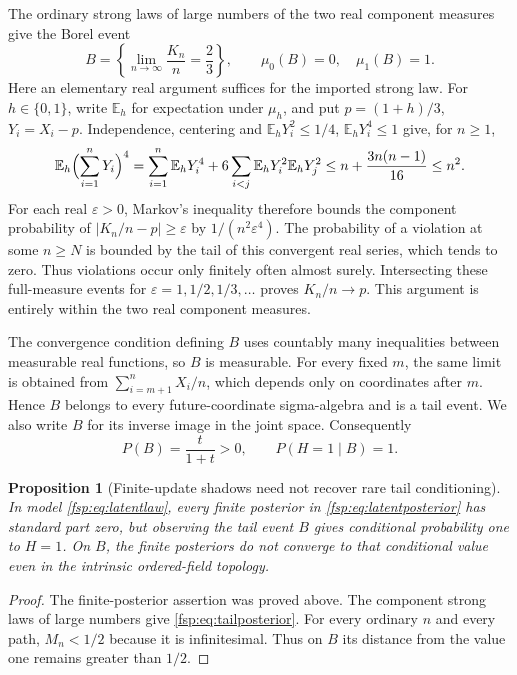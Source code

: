 \documentclass[11pt,a4paper]{article}
\numberwithin{equation}{section}
\newtheorem{proposition}[theorem]{Proposition}
\theoremstyle{definition}
\theoremstyle{remark}
\newcommand{\E}{\mathbb E}
\begin{document}
The ordinary strong laws of large numbers of the two real component measures
\cite{kallenberg} give the Borel event
\begin{equation}
 B=\left\{\lim_{n\to\infty}\frac{K_n}{n}=\frac23\right\},
 \qquad \mu_0(B)=0,\quad\mu_1(B)=1.
\end{equation}
Here an elementary real argument suffices for the imported strong law.
For $h\in\{0,1\}$, write $\E_h$ for expectation under $\mu_h$,
and put $p=(1+h)/3$, $Y_i=X_i-p$.
Independence, centering and $\E_h Y_i^2\le1/4$, $\E_h Y_i^4\le1$ give, for $n\ge1$,
\[
 \E_h\Bigl(\sum_{i=1}^nY_i\Bigr)^4
 =\sum_{i=1}^n\E_h Y_i^4
   +6\sum_{i<j}\E_h Y_i^2\E_h Y_j^2
 \le n+\frac{3n(n-1)}{16}\le n^2.
\]
For each real $\varepsilon>0$, Markov's inequality therefore bounds
the component probability of $|K_n/n-p|\ge\varepsilon$ by
$1/(n^2\varepsilon^4)$.
The probability of a violation at some $n\ge N$ is bounded by the
tail of this convergent real series, which tends to zero. Thus violations
occur only finitely often almost surely. Intersecting these full-measure
events for $\varepsilon=1,1/2,1/3,\ldots$ proves $K_n/n\to p$.
This argument is entirely within the two real component measures.

The convergence condition defining $B$ uses countably many inequalities
between measurable real functions, so $B$ is measurable. For every fixed
$m$, the same limit is obtained from $\sum_{i=m+1}^nX_i/n$, which depends
only on coordinates after $m$. Hence $B$ belongs to every future-coordinate
sigma-algebra and is a tail event. We also write $B$ for its inverse image
in the joint space. Consequently
\begin{equation}\label{fsp:eq:tailposterior}
 P(B)=\frac{t}{1+t}>0,
 \qquad P(H=1\mid B)=1.
\end{equation}

\begin{proposition}[Finite-update shadows need not recover rare tail conditioning]
\label{fsp:prop:tailfailure}
In model \eqref{fsp:eq:latentlaw}, every finite posterior in
\eqref{fsp:eq:latentposterior} has standard part zero, but observing the tail
event $B$ gives conditional probability one to $H=1$. On $B$, the
finite posteriors do not converge to that conditional value even in the
intrinsic ordered-field topology.
\end{proposition}
\begin{proof}
The finite-posterior assertion was proved above. The component strong
laws of large numbers give \eqref{fsp:eq:tailposterior}. For every ordinary $n$ and every
path, $M_n<1/2$ because it is infinitesimal. Thus on $B$ its distance
from the value one remains greater than $1/2$.
\end{proof}
\end{document}
